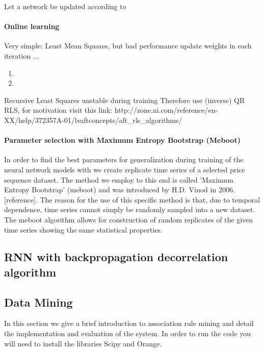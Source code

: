 \begin{frm-thm}
Let a network be updated according to
\end{frm-thm}

\paragraph*{Online learning}
Very simple: Least Mean Squares, but bad performance
update weights in each iteration
...
\begin{frm-algo}
\begin{enumerate}
	\item

	\item

\end{enumerate}
\end{frm-algo}

Recursive Least Squares unstable during training
Therefore use (inverse) QR RLS, for motivation visit this link:
http://zone.ni.com/reference/en-XX/help/372357A-01/lvaftconcepts/aft\_rls\_algorithms/

\paragraph*{Parameter selection with Maximum Entropy Bootstrap (Meboot)}
In order to find the best parameters for generalization during training of the neural network models with we create replicate time series of a selected price sequence dataset. The method we employ to this end is called 'Maximum Entropy Bootstrap' (meboot) and was introduced by H.D. Vinod in 2006. [reference]. The reason for the use of this specific method is that, due to temporal dependence, time series cannot simply be randomly sampled into a new dataset. The meboot algorithm allows for construction of random replicates of the given time series showing the same statistical properties.

\subsection*{RNN with backpropagation decorrelation algorithm}

\subsection*{Data Mining}

In this section we give a brief introduction to association rule mining and detail the implementation and evaluation of the system. In order to run the code you will need to install the libraries Scipy and Orange.

